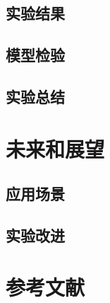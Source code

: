 \documentclass{article}
\begin{document}
\subsection{实验结果}
\subsection{模型检验}
\subsection{实验总结}

\section{未来和展望}
\subsection{应用场景}
\subsection{实验改进}

\section{参考文献}
\end{document}
